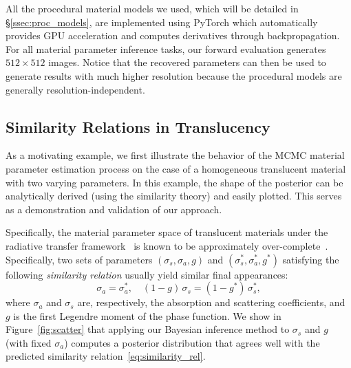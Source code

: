 All the procedural material models we used, which will be detailed in \S\ref{ssec:proc_models}, are implemented using \textsf{PyTorch} which %
automatically provides GPU acceleration and computes derivatives through backpropagation. %
For all material parameter inference tasks, our forward evaluation generates $512 \times 512$ images.
Notice that the recovered parameters can then be used to generate results with much higher resolution because the procedural models are generally resolution-independent.

\subsection{Similarity Relations in Translucency}

As a motivating example, we first illustrate the behavior of the MCMC material parameter estimation process on the case of a homogeneous translucent material with two varying parameters.
In this example, the shape of the posterior can be analytically derived (using the similarity theory) and easily plotted. This serves as a demonstration and validation of our approach.

Specifically, the material parameter space of translucent materials under the radiative transfer framework~\cite{chandrasekhar1960radiative} is known to be approximately over-complete~\cite{Zhao:2014:HSR}.
Specifically, two sets of parameters $(\sigma_s, \sigma_a, g)$ and $(\sigma_s^*, \sigma_a^*, g^*)$ satisfying the following \emph{similarity relation} usually yield similar final appearances:
%
\begin{equation}
	\label{eq:similarity_rel}
	\sigma_a = \sigma_a^*, \quad (1 - g)\,\sigma_s = (1 - g^*)\,\sigma_s^*,
\end{equation}
%
where $\sigma_a$ and $\sigma_s$ are, respectively, the absorption and scattering coefficients, and $g$ is the first Legendre moment of the phase function.
We show in Figure~\ref{fig:scatter} that applying our Bayesian inference method to $\sigma_s$ and $g$ (with fixed $\sigma_a$) computes a posterior distribution that agrees well with the predicted similarity relation~\eqref{eq:similarity_rel}.

